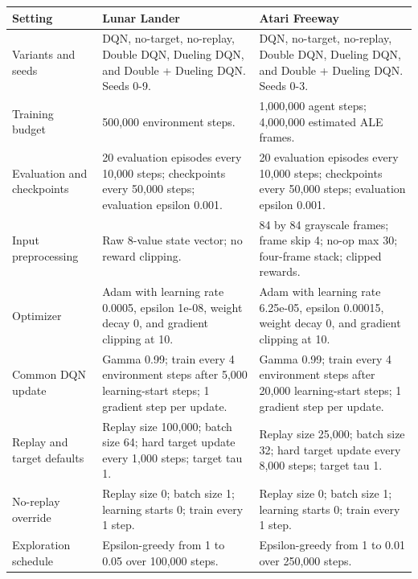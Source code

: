 \begin{tabularx}{\textwidth}{@{}>{\raggedright\arraybackslash}p{}YY@{}}
\toprule
\textbf{Setting} & \textbf{Lunar Lander} & \textbf{Atari Freeway} \\
\midrule
Variants and seeds & DQN, no-target, no-replay, Double DQN, Dueling DQN, and Double + Dueling DQN. Seeds 0-9. & DQN, no-target, no-replay, Double DQN, Dueling DQN, and Double + Dueling DQN. Seeds 0-3. \\
Training budget & 500,000 environment steps. & 1,000,000 agent steps; 4,000,000 estimated ALE frames. \\
Evaluation and checkpoints & 20 evaluation episodes every 10,000 steps; checkpoints every 50,000 steps; evaluation epsilon 0.001. & 20 evaluation episodes every 10,000 steps; checkpoints every 50,000 steps; evaluation epsilon 0.001. \\
Input preprocessing & Raw 8-value state vector; no reward clipping. & 84 by 84 grayscale frames; frame skip 4; no-op max 30; four-frame stack; clipped rewards. \\
Optimizer & Adam with learning rate 0.0005, epsilon 1e-08, weight decay 0, and gradient clipping at 10. & Adam with learning rate 6.25e-05, epsilon 0.00015, weight decay 0, and gradient clipping at 10. \\
Common DQN update & Gamma 0.99; train every 4 environment steps after 5,000 learning-start steps; 1 gradient step per update. & Gamma 0.99; train every 4 environment steps after 20,000 learning-start steps; 1 gradient step per update. \\
Replay and target defaults & Replay size 100,000; batch size 64; hard target update every 1,000 steps; target tau 1. & Replay size 25,000; batch size 32; hard target update every 8,000 steps; target tau 1. \\
No-replay override & Replay size 0; batch size 1; learning starts 0; train every 1 step. & Replay size 0; batch size 1; learning starts 0; train every 1 step. \\
Exploration schedule & Epsilon-greedy from 1 to 0.05 over 100,000 steps. & Epsilon-greedy from 1 to 0.01 over 250,000 steps. \\
\bottomrule
\end{tabularx}
